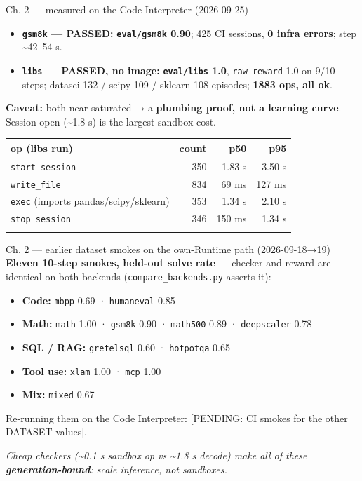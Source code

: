 \documentclass[
  10pt,
  ignorenonframetext,
  aspectratio=169,
  t]{beamer}
\providecommand{\tightlist}{%
  \setlength{\itemsep}{0pt}\setlength{\parskip}{0pt}}
\begin{document}
\begin{frame}{Ch. 2 --- measured on the Code Interpreter
(2026-09-25)}
\protect\hypertarget{ch.-2-measured-on-the-code-interpreter-2026-09-25}{}
\small

\begin{itemize}
\tightlist
\item
  \textbf{\texttt{gsm8k} --- PASSED:} \textbf{\texttt{eval/gsm8k} 0.90};
  425 CI sessions, \textbf{0 infra errors}; step \textasciitilde42--54
  s.
\item
  \textbf{\texttt{libs} --- PASSED, no image:}
  \textbf{\texttt{eval/libs} 1.0}, \texttt{raw\_reward} 1.0 on 9/10
  steps; datasci 132 / scipy 109 / sklearn 108 episodes; \textbf{1883
  ops, all ok}.
\end{itemize}

\textbf{Caveat:} both near-saturated → a \textbf{plumbing proof, not a
learning curve}. Session open (\textasciitilde1.8 s) is the largest
sandbox cost.

\begin{longtable}[]{@{}lrrr@{}}
\toprule\noalign{}
op (libs run) & count & p50 & p95 \\
\midrule\noalign{}
\endhead
\texttt{start\_session} & 350 & 1.83 s & 3.50 s \\
\texttt{write\_file} & 834 & 69 ms & 127 ms \\
\texttt{exec} (imports pandas/scipy/sklearn) & 353 & 1.34 s & 2.10 s \\
\texttt{stop\_session} & 346 & 150 ms & 1.34 s \\
\bottomrule\noalign{}
\end{longtable}
\end{frame}

\begin{frame}{Ch. 2 --- earlier dataset smokes on the
own-Runtime path (2026-09-18→19)}
\protect\hypertarget{ch.-2-earlier-dataset-smokes-on-the-own-runtime-path-2026-09-1819}{}
\textbf{Eleven 10-step smokes, held-out solve rate} --- checker and
reward are identical on both backends (\texttt{compare\_backends.py}
asserts it):

\begin{itemize}
\tightlist
\item
  \textbf{Code:} \texttt{mbpp} 0.69 · \texttt{humaneval} 0.85
\item
  \textbf{Math:} \texttt{math} 1.00 · \texttt{gsm8k} 0.90 ·
  \texttt{math500} 0.89 · \texttt{deepscaler} 0.78
\item
  \textbf{SQL / RAG:} \texttt{gretelsql} 0.60 · \texttt{hotpotqa} 0.65
\item
  \textbf{Tool use:} \texttt{xlam} 1.00 · \texttt{mcp} 1.00
\item
  \textbf{Mix:} \texttt{mixed} 0.67
\end{itemize}

Re-running them on the Code Interpreter: {[}PENDING: CI smokes for the
other DATASET values{]}.

\emph{Cheap checkers (\textasciitilde0.1 s sandbox op vs
\textasciitilde1.8 s decode) make all of these
\textbf{generation-bound}: scale inference, not sandboxes.}
\end{frame}
\end{document}
